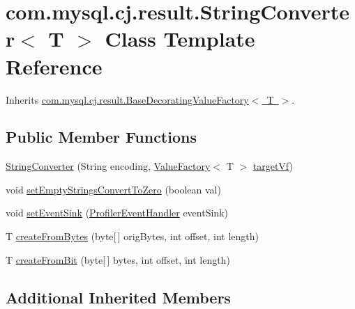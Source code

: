 \hypertarget{classcom_1_1mysql_1_1cj_1_1result_1_1_string_converter}{}\section{com.\+mysql.\+cj.\+result.\+String\+Converter$<$ T $>$ Class Template Reference}
\label{classcom_1_1mysql_1_1cj_1_1result_1_1_string_converter}


Inherits \mbox{\hyperlink{classcom_1_1mysql_1_1cj_1_1result_1_1_base_decorating_value_factory}{com.\+mysql.\+cj.\+result.\+Base\+Decorating\+Value\+Factory$<$ T $>$}}.

\subsection*{Public Member Functions}
\begin{DoxyCompactItemize}
\item 
\mbox{\hyperlink{classcom_1_1mysql_1_1cj_1_1result_1_1_string_converter_aa40363fd36257ba577e49dfc3d9b26d4}{String\+Converter}} (String encoding, \mbox{\hyperlink{interfacecom_1_1mysql_1_1cj_1_1result_1_1_value_factory}{Value\+Factory}}$<$ T $>$ \mbox{\hyperlink{classcom_1_1mysql_1_1cj_1_1result_1_1_base_decorating_value_factory_a64c2c62bd9906ec3af7fc62e58bf34b3}{target\+Vf}})
\item 
void \mbox{\hyperlink{classcom_1_1mysql_1_1cj_1_1result_1_1_string_converter_ab43f945452ba741f823d67b68b3bade8}{set\+Empty\+Strings\+Convert\+To\+Zero}} (boolean val)
\item 
void \mbox{\hyperlink{classcom_1_1mysql_1_1cj_1_1result_1_1_string_converter_a5760eb57f0d3b27722734bd63e741507}{set\+Event\+Sink}} (\mbox{\hyperlink{interfacecom_1_1mysql_1_1cj_1_1log_1_1_profiler_event_handler}{Profiler\+Event\+Handler}} event\+Sink)
\item 
T \mbox{\hyperlink{classcom_1_1mysql_1_1cj_1_1result_1_1_string_converter_a62092d8d4f0919ee0c63e7b4caf29d5a}{create\+From\+Bytes}} (byte\mbox{[}$\,$\mbox{]} orig\+Bytes, int offset, int length)
\item 
T \mbox{\hyperlink{classcom_1_1mysql_1_1cj_1_1result_1_1_string_converter_a328be706c2bb9de113338b42cb20d8c6}{create\+From\+Bit}} (byte\mbox{[}$\,$\mbox{]} bytes, int offset, int length)
\end{DoxyCompactItemize}
\subsection*{Additional Inherited Members}



